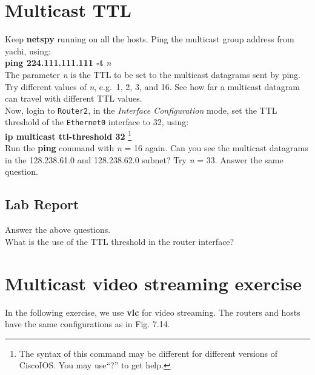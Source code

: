 \documentclass[10pt,a4paper]{article}
\numberwithin{equation}{section}
\numberwithin{figure}{section}
\numberwithin{table}{section}
\begin{document}
    \section{Multicast TTL}
    Keep \textbf{netspy} running on all the hosts.
    Ping the multicast group address from yachi, using: \\
    \textbf{ping 224.111.111.111 -t} \textit{n} \\
    The parameter \textit{n} is the TTL to be set to the multicast datagrams sent by ping.
    Try different values of \textit{n}, e.g.\  1, 2, 3, and 16.
    See how far a multicast datagram can travel with different TTL values. \\
    Now, login to \texttt{Router2}, in the \textit{Interface Configuration} mode, set the TTL threshold of the \texttt{Ethernet0} interface to 32, using: \\
    \textbf{ip multicast ttl-threshold 32}
    \footnote{The syntax of this command may be different for different versions of CiscoIOS. You may use“?” to get help.} \\
    Run the \textbf{ping} command with \textit{n} = 16 again.
    Can you see the multicast datagrams in the 128.238.61.0 and 128.238.62.0 subnet?
    Try \textit{n} = 33.
    Answer the same question.
    \subsection*{Lab Report}
    Answer the above questions. \\
    What is the use of the TTL threshold in the router interface?

    \section*{Multicast video streaming exercise}
    In the following exercise, we use \textbf{vlc} for video streaming.
    The routers and hosts have the same configurations as in Fig. 7.14.
\end{document}

